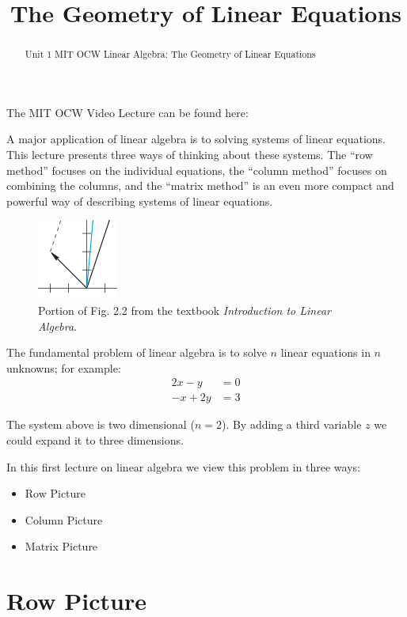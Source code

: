 \documentclass{ximera}
\title{The Geometry of Linear Equations}
\begin{document}
\begin{abstract}
  Unit 1 MIT OCW Linear Algebra: The Geometry of Linear Equations
\end{abstract}
\maketitle

The MIT OCW Video Lecture can be found
here:


A major application of linear algebra is to solving systems of linear
equations. This lecture presents three ways of thinking about these
systems. The ``row method'' focuses on the individual equations, the
``column method'' focuses on combining the columns, and the ``matrix
method'' is an even more compact and powerful way of describing
systems of linear equations.

\begin{figure}[H]
\begin{image}
\includegraphics{1_1.jpg}
\end{image}
\caption{Portion of Fig. 2.2 from the textbook \textit{Introduction to
    Linear Algebra}.}
\end{figure}

The fundamental problem of linear algebra is to solve $n$ linear
equations in $n$ unknowns; for example:
\begin{align*}
  2x-y &= 0 \\ 
  -x+2y &= 3
\end{align*}


The system above is two dimensional ($n = 2$). By adding a third
variable $z$ we could expand it to three dimensions.


In this first lecture on linear algebra we view this problem in three
ways:

\begin{itemize}
\item Row Picture
\item Column Picture
\item Matrix Picture
\end{itemize}

\section*{Row Picture}
\end{document}

